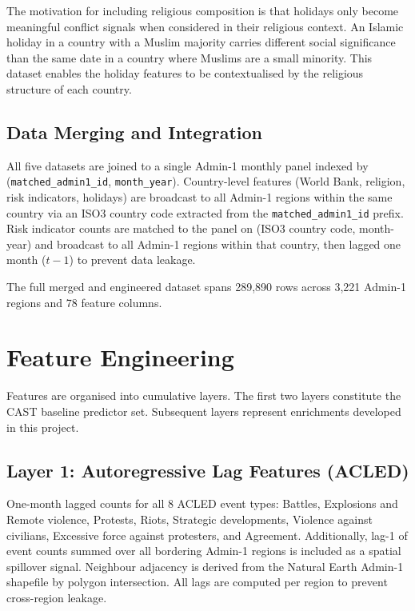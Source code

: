 \documentclass[12pt,a4paper]{article}
\begin{document}
The motivation for including religious composition is that holidays only
become meaningful conflict signals when considered in their religious
context. An Islamic holiday in a country with a Muslim majority carries
different social significance than the same date in a country where
Muslims are a small minority. This dataset enables the holiday features
to be contextualised by the religious structure of each country.

\subsection{Data Merging and Integration}

All five datasets are joined to a single Admin-1 monthly panel indexed
by (\texttt{matched\_admin1\_id}, \texttt{month\_year}). Country-level
features (World Bank, religion, risk indicators, holidays) are broadcast
to all Admin-1 regions within the same country via an ISO3 country code
extracted from the \texttt{matched\_admin1\_id} prefix. Risk indicator counts are matched to the panel on (ISO3 country code,
month-year) and broadcast to all Admin-1 regions within that country,
then lagged one month ($t-1$) to prevent data leakage.

The full merged and engineered dataset spans 289,890 rows across
3,221 Admin-1 regions and 78 feature columns.


\section{Feature Engineering}

Features are organised into cumulative layers. The first two layers
constitute the CAST baseline predictor set. Subsequent layers represent
enrichments developed in this project.

\subsection{Layer 1: Autoregressive Lag Features (ACLED)}

One-month lagged counts for all 8 ACLED event types: Battles, Explosions
and Remote violence, Protests, Riots, Strategic developments, Violence
against civilians, Excessive force against protesters, and Agreement.
Additionally, lag-1 of event counts summed over all bordering Admin-1
regions is included as a spatial spillover signal. Neighbour adjacency
is derived from the Natural Earth Admin-1 shapefile by polygon
intersection. All lags are computed per region to prevent cross-region
leakage.
\end{document}
